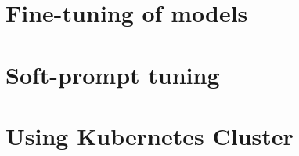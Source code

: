 \section{Fine-tuning of models}

\section{Soft-prompt tuning}

\section{Using Kubernetes Cluster}









